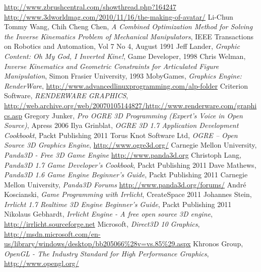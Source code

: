 \documentclass[11pt]{mwrep}
\begin{document}
\begin{thebibliography}{99}

 \url{http://www.zbrushcentral.com/showthread.php?164247}
 \url{http://www.3dworldmag.com/2010/11/16/the-making-of-avatar/}
 Li-Chun Tommy Wang, Chih Cheng Chen, \textit{A Combined Optimization Method for Solving the Inverse Kinematics Problem of Mechanical Manipulators}, IEEE Transactions on Robotics and Automation, Vol 7 No 4, August 1991
 Jeff Lander, \textit{Graphic Content: Oh My God, I Inverted Kine!}, Game Developer, 1998
 Chris Welman, \textit{Inverse Kinematics and Geometric Constraints for Articulated Figure Manipulation}, Simon Frasier University, 1993
 MobyGames, \textit{Graphics Engine: RenderWare}, \url{http://www.advancedlinuxprogramming.com/alp-folder}
 Criterion Software, \textit{RENDERWARE GRAPHICS}, \url{http://web.archive.org/web/20070105144827/http://www.renderware.com/graphics.asp}
 Gregory Junker, \textit{Pro OGRE 3D Programming (Expert's Voice in Open Source)}, Apress 2006
 Ilya Grinblat, \textit{OGRE 3D 1.7 Application Development Cookbookt}, Packt Publishing 2011
 Torus Knot Software Ltd, \textit{OGRE -- Open Source 3D Graphics Engine}, \url{http://www.ogre3d.org/}
 Carnegie Mellon University, \textit{Panda3D - Free 3D Game Engine} \url{http://www.panda3d.org}
 Christoph Lang, \textit{Panda3D 1.7 Game Developer's Cookbook}, Packt Publishing 2011
 Dave Mathews, \textit{Panda3D 1.6 Game Engine Beginner's Guide}, Packt Publishing 2011
 Carnegie Mellon University, \textit{Panda3D Forums} \url{http://www.panda3d.org/forums/}
 André Koscianski, \textit{Game Programming with Irrlicht}, CreateSpace 2011
 Johannes Stein, \textit{Irrlicht 1.7 Realtime 3D Engine Beginner's Guide}, Packt Publishing 2011
 Nikolaus Gebhardt, \textit{Irrlicht Engine - A free open source 3D engine}, \url{http://irrlicht.sourceforge.net}
 Microsoft, \textit{Direct3D 10 Graphics}, \url{http://msdn.microsoft.com/en-us/library/windows/desktop/bb205066%28v=vs.85%29.aspx}
 Khronos Group, \textit{OpenGL - The Industry Standard for High Performance Graphics}, \url{http://www.opengl.org/}

\end{thebibliography}

\end{document}
